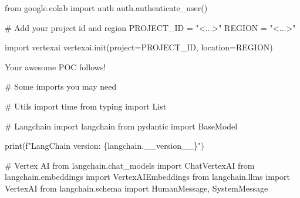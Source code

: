 \documentclass[
  letterpaper,
  DIV=11,
  numbers=noendperiod]{scrreprt}
\newenvironment{Shaded}{\begin{snugshade}}{\end{snugshade}}
\newcommand{\BuiltInTok}[1]{\textcolor[rgb]{0.00,0.23,0.31}{#1}}
\newcommand{\CommentTok}[1]{\textcolor[rgb]{0.37,0.37,0.37}{#1}}
\newcommand{\ImportTok}[1]{\textcolor[rgb]{0.00,0.46,0.62}{#1}}
\newcommand{\NormalTok}[1]{\textcolor[rgb]{0.00,0.23,0.31}{#1}}
\newcommand{\OperatorTok}[1]{\textcolor[rgb]{0.37,0.37,0.37}{#1}}
\newcommand{\SpecialCharTok}[1]{\textcolor[rgb]{0.37,0.37,0.37}{#1}}
\newcommand{\SpecialStringTok}[1]{\textcolor[rgb]{0.13,0.47,0.30}{#1}}
\newcommand{\StringTok}[1]{\textcolor[rgb]{0.13,0.47,0.30}{#1}}
\begin{document}
\begin{Shaded}
\begin{Highlighting}[]
\ImportTok{from}\NormalTok{ google.colab }\ImportTok{import}\NormalTok{ auth}
\NormalTok{auth.authenticate\_user()}
\end{Highlighting}
\end{Shaded}

\begin{Shaded}
\begin{Highlighting}[]
\CommentTok{\# Add your project id and region}
\NormalTok{PROJECT\_ID }\OperatorTok{=} \StringTok{"\textless{}...\textgreater{}"}
\NormalTok{REGION }\OperatorTok{=} \StringTok{"\textless{}...\textgreater{}"}
\end{Highlighting}
\end{Shaded}

\begin{Shaded}
\begin{Highlighting}[]
\ImportTok{import}\NormalTok{ vertexai}
\NormalTok{vertexai.init(project}\OperatorTok{=}\NormalTok{PROJECT\_ID, location}\OperatorTok{=}\NormalTok{REGION)}
\end{Highlighting}
\end{Shaded}

Your awesome POC follows!

\begin{Shaded}
\begin{Highlighting}[]
\CommentTok{\# Some imports you may need}

\CommentTok{\# Utils}
\ImportTok{import}\NormalTok{ time}
\ImportTok{from}\NormalTok{ typing }\ImportTok{import}\NormalTok{ List}

\CommentTok{\# Langchain}
\ImportTok{import}\NormalTok{ langchain}
\ImportTok{from}\NormalTok{ pydantic }\ImportTok{import}\NormalTok{ BaseModel}

\BuiltInTok{print}\NormalTok{(}\SpecialStringTok{f"LangChain version: }\SpecialCharTok{\{}\NormalTok{langchain}\SpecialCharTok{.}\NormalTok{\_\_version\_\_}\SpecialCharTok{\}}\SpecialStringTok{"}\NormalTok{)}

\CommentTok{\# Vertex AI}
\ImportTok{from}\NormalTok{ langchain.chat\_models }\ImportTok{import}\NormalTok{ ChatVertexAI}
\ImportTok{from}\NormalTok{ langchain.embeddings }\ImportTok{import}\NormalTok{ VertexAIEmbeddings}
\ImportTok{from}\NormalTok{ langchain.llms }\ImportTok{import}\NormalTok{ VertexAI}
\ImportTok{from}\NormalTok{ langchain.schema }\ImportTok{import}\NormalTok{ HumanMessage, SystemMessage}
\end{Highlighting}
\end{Shaded}
\end{document}
